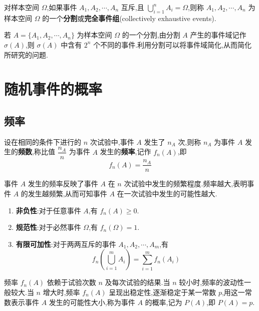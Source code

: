 \begin{definition}
    \indent 对样本空间 $\varOmega$,如果事件 $A_1,A_2,\cdots,A_n$ 互斥,且 $\displaystyle\bigcup_{i=1}^n A_i=\varOmega$,则称 $A_1,A_2,\cdots,A_n$ 为样本空间 $\varOmega$ 的一个\textbf{分割}或\textbf{完全事件组}(collectively exhaustive events).
\end{definition}

若 $A = \{ A_1,A_2,\cdots,A_n \}$ 为样本空间 $\varOmega$ 的一个分割,由分割 $A$ 产生的事件域记作 $\sigma(A)$,则 $\sigma(A)$ 中含有 $2^n$ 个不同的事件.利用分割可以将事件域简化,从而简化所研究的问题.

\section{随机事件的概率}

\subsection{频率}

\begin{definition}
    \indent 设在相同的条件下进行的 $n$ 次试验中,事件 $A$ 发生了 $n_A$ 次,则称 $n_A$ 为事件 $A$ 发生的\textbf{频数},称比值 $\dfrac{n_A}{n}$ 为事件 $A$ 发生的\textbf{频率},记作 $f_n(A)$,即
    $$
    f_n(A)=\dfrac{n_A}{n}
    $$
\end{definition}

事件 $A$ 发生的频率反映了事件 $A$ 在 $n$ 次试验中发生的频繁程度.频率越大,表明事件 $A$ 的发生越频繁,从而可知事件 $A$ 在一次试验中发生的可能性越大.

\begin{property}[][频率的基本性质]
    \begin{enumerate}
        \item \textbf{非负性}:对于任意事件 $A$,有 $f_n(A) \geqslant 0$.
        \item \textbf{规范性}:对于必然事件 $\varOmega$,有 $f_n(\varOmega)=1$.
        \item \textbf{有限可加性}:对于两两互斥的事件 $A_1,A_2,\cdots,A_m$,有
        $$
        f_n \left(\bigcup_{i=1}^m A_i \right) = \sum_{i=1}^m f_n(A_i)
        $$
    \end{enumerate}
\end{property}

频率 $f_n(A)$ 依赖于试验次数 $n$ 及每次试验的结果.当 $n$ 较小时,频率的波动性一般较大.当 $n$ 增大时,频率 $f_n(A)$ 呈现出稳定性,逐渐稳定于某一常数 $p$,用这一常数表示事件 $A$ 发生的可能性大小,称为事件 $A$ 的概率,记为 $P(A)$,即 $P(A)=p$.

